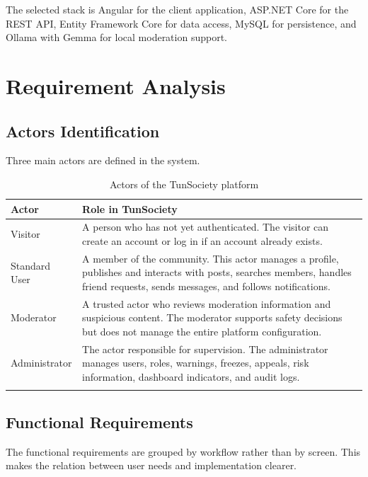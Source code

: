 The selected stack is Angular for the client application, ASP.NET Core for the REST API, Entity Framework Core for data access, MySQL for persistence, and Ollama with Gemma for local moderation support.

\section{Requirement Analysis}

\subsection{Actors Identification}

Three main actors are defined in the system.

\begin{longtable}{|m{3cm}|m{10.8cm}|}
\hline
\textbf{Actor} & \textbf{Role in TunSociety} \\
\hline
Visitor & A person who has not yet authenticated. The visitor can create an account or log in if an account already exists. \\
\hline
Standard User & A member of the community. This actor manages a profile, publishes and interacts with posts, searches members, handles friend requests, sends messages, and follows notifications. \\
\hline
Moderator & A trusted actor who reviews moderation information and suspicious content. The moderator supports safety decisions but does not manage the entire platform configuration. \\
\hline
Administrator & The actor responsible for supervision. The administrator manages users, roles, warnings, freezes, appeals, risk information, dashboard indicators, and audit logs. \\
\hline
\caption{Actors of the TunSociety platform}
\end{longtable}

\subsection{Functional Requirements}

The functional requirements are grouped by workflow rather than by screen. This makes the relation between user needs and implementation clearer.

